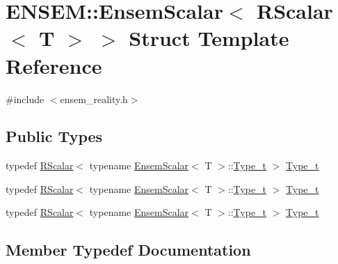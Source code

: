 \hypertarget{structENSEM_1_1EnsemScalar_3_01RScalar_3_01T_01_4_01_4}{}\section{E\+N\+S\+EM\+:\+:Ensem\+Scalar$<$ R\+Scalar$<$ T $>$ $>$ Struct Template Reference}
\label{structENSEM_1_1EnsemScalar_3_01RScalar_3_01T_01_4_01_4}


{\ttfamily \#include $<$ensem\+\_\+reality.\+h$>$}

\subsection*{Public Types}
\begin{DoxyCompactItemize}
\item 
typedef \mbox{\hyperlink{classENSEM_1_1RScalar}{R\+Scalar}}$<$ typename \mbox{\hyperlink{structENSEM_1_1EnsemScalar}{Ensem\+Scalar}}$<$ T $>$\+::\mbox{\hyperlink{structENSEM_1_1EnsemScalar_3_01RScalar_3_01T_01_4_01_4_a153cd6d2b242e40d3614a2801d091aad}{Type\+\_\+t}} $>$ \mbox{\hyperlink{structENSEM_1_1EnsemScalar_3_01RScalar_3_01T_01_4_01_4_a153cd6d2b242e40d3614a2801d091aad}{Type\+\_\+t}}
\item 
typedef \mbox{\hyperlink{classENSEM_1_1RScalar}{R\+Scalar}}$<$ typename \mbox{\hyperlink{structENSEM_1_1EnsemScalar}{Ensem\+Scalar}}$<$ T $>$\+::\mbox{\hyperlink{structENSEM_1_1EnsemScalar_3_01RScalar_3_01T_01_4_01_4_a153cd6d2b242e40d3614a2801d091aad}{Type\+\_\+t}} $>$ \mbox{\hyperlink{structENSEM_1_1EnsemScalar_3_01RScalar_3_01T_01_4_01_4_a153cd6d2b242e40d3614a2801d091aad}{Type\+\_\+t}}
\item 
typedef \mbox{\hyperlink{classENSEM_1_1RScalar}{R\+Scalar}}$<$ typename \mbox{\hyperlink{structENSEM_1_1EnsemScalar}{Ensem\+Scalar}}$<$ T $>$\+::\mbox{\hyperlink{structENSEM_1_1EnsemScalar_3_01RScalar_3_01T_01_4_01_4_a153cd6d2b242e40d3614a2801d091aad}{Type\+\_\+t}} $>$ \mbox{\hyperlink{structENSEM_1_1EnsemScalar_3_01RScalar_3_01T_01_4_01_4_a153cd6d2b242e40d3614a2801d091aad}{Type\+\_\+t}}
\end{DoxyCompactItemize}


\subsection{Member Typedef Documentation}
\mbox{\label{structENSEM_1_1EnsemScalar_3_01RScalar_3_01T_01_4_01_4_a153cd6d2b242e40d3614a2801d091aad}} 
